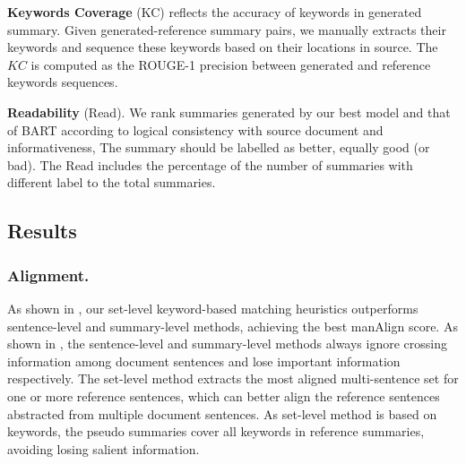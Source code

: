 \textbf{Keywords Coverage} (KC)
reflects the accuracy of keywords in generated summary.
Given generated-reference summary pairs, we manually
extracts their keywords and sequence these keywords based on their locations in source. 
The $KC$ is computed as the ROUGE-1 precision
between generated and reference keywords sequences.

\textbf{Readability} (Read).
We rank summaries 
generated by our best model and that of
BART according to logical consistency with source document and informativeness,
The summary should be labelled as better, equally good (or bad).   
The Read includes the percentage of the number of summaries 
with different label to the total summaries.

\subsection{Results}

\subsubsection{Alignment.}
As shown in , 
our set-level keyword-based matching heuristics outperforms 
sentence-level and summary-level methods, achieving the best manAlign score.
As shown in , 
the sentence-level and summary-level methods always
ignore crossing information among document sentences
and lose important information respectively. 
The set-level method extracts the most aligned multi-sentence set 
for one or more reference sentences,
which can better align the reference sentences abstracted from multiple document sentences.
As set-level method is based on keywords, 
the pseudo summaries cover all keywords in reference summaries,
avoiding losing salient information.

